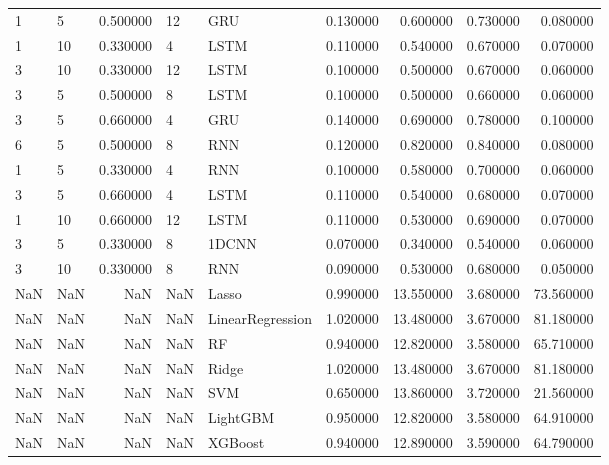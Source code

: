 \begin{tabular}{llrllrrrr}
1 & 5 & 0.500000 & 12 & GRU & 0.130000 & 0.600000 & 0.730000 & 0.080000 \\
1 & 10 & 0.330000 & 4 & LSTM & 0.110000 & 0.540000 & 0.670000 & 0.070000 \\
3 & 10 & 0.330000 & 12 & LSTM & 0.100000 & 0.500000 & 0.670000 & 0.060000 \\
3 & 5 & 0.500000 & 8 & LSTM & 0.100000 & 0.500000 & 0.660000 & 0.060000 \\
3 & 5 & 0.660000 & 4 & GRU & 0.140000 & 0.690000 & 0.780000 & 0.100000 \\
6 & 5 & 0.500000 & 8 & RNN & 0.120000 & 0.820000 & 0.840000 & 0.080000 \\
1 & 5 & 0.330000 & 4 & RNN & 0.100000 & 0.580000 & 0.700000 & 0.060000 \\
3 & 5 & 0.660000 & 4 & LSTM & 0.110000 & 0.540000 & 0.680000 & 0.070000 \\
1 & 10 & 0.660000 & 12 & LSTM & 0.110000 & 0.530000 & 0.690000 & 0.070000 \\
3 & 5 & 0.330000 & 8 & 1DCNN & 0.070000 & 0.340000 & 0.540000 & 0.060000 \\
3 & 10 & 0.330000 & 8 & RNN & 0.090000 & 0.530000 & 0.680000 & 0.050000 \\
NaN & NaN & NaN & NaN & Lasso & 0.990000 & 13.550000 & 3.680000 & 73.560000 \\
NaN & NaN & NaN & NaN & LinearRegression & 1.020000 & 13.480000 & 3.670000 & 81.180000 \\
NaN & NaN & NaN & NaN & RF & 0.940000 & 12.820000 & 3.580000 & 65.710000 \\
NaN & NaN & NaN & NaN & Ridge & 1.020000 & 13.480000 & 3.670000 & 81.180000 \\
NaN & NaN & NaN & NaN & SVM & 0.650000 & 13.860000 & 3.720000 & 21.560000 \\
NaN & NaN & NaN & NaN & LightGBM & 0.950000 & 12.820000 & 3.580000 & 64.910000 \\
NaN & NaN & NaN & NaN & XGBoost & 0.940000 & 12.890000 & 3.590000 & 64.790000 \\
\bottomrule
\end{tabular}
